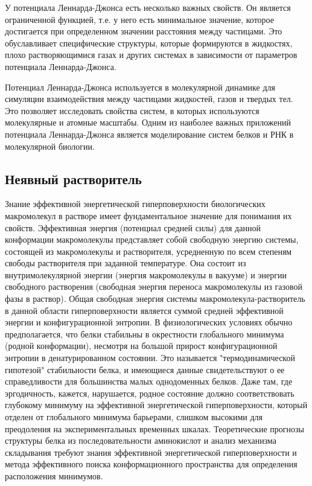 У потенциала Леннарда-Джонса есть несколько важных свойств. Он является ограниченной функцией, т.е. у него есть минимальное значение, которое достигается при определенном значении расстояния между частицами. Это обуславливает специфические структуры, которые формируются в жидкостях, плохо растворяющимися газах и других системах в зависимости от параметров потенциала Леннарда-Джонса.

Потенциал Леннарда-Джонса используется в молекулярной динамике для симуляции взаимодействия между частицами жидкостей, газов и твердых тел. Это позволяет исследовать свойства систем, в которых используются молекулярные и атомные масштабы. Одним из наиболее важных приложений потенциала Леннарда-Джонса является моделирование систем белков и РНК в молекулярной биологии.


\subsection{Неявный растворитель}


Знание эффективной энергетической гиперповерхности биологических макромолекул в растворе имеет фундаментальное значение для понимания их свойств. Эффективная энергия (потенциал средней силы) для данной конформации макромолекулы представляет собой свободную энергию системы, состоящей из макромолекулы и растворителя, усредненную по всем степеням свободы растворителя при заданной температуре. Она состоит из внутримолекулярной энергии (энергия макромолекулы в вакууме) и энергии свободного растворения (свободная энергия переноса макромолекулы из газовой фазы в раствор). Общая свободная энергия системы макромолекула-растворитель в данной области гиперповерхности является суммой средней эффективной энергии и конфигурационной энтропии. В физиологических условиях обычно предполагается, что белки стабильны в окрестности глобального минимума (родной конформации), несмотря на большой прирост конфигурационной энтропии в денатурированном состоянии. Это называется "термодинамической гипотезой" стабильности белка, и имеющиеся данные свидетельствуют о ее справедливости для большинства малых однодоменных белков. Даже там, где эргодичность, кажется, нарушается, родное состояние должно соответствовать глубокому минимуму на эффективной энергетической гиперповерхности, который отделен от глобального минимума барьерами, слишком высокими для преодоления на экспериментальных временных шкалах. Теоретические прогнозы структуры белка из последовательности аминокислот и анализ механизма складывания требуют знания эффективной энергетической гиперповерхности и метода эффективного поиска конформационного пространства для определения расположения минимумов.

